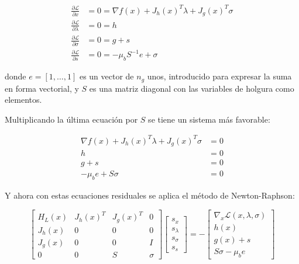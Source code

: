 \begin{align}
	\frac{\partial \mathcal{L}}{\partial x}       & = 0 = \nabla f(x) + J_h(x)^T \lambda + J_g(x)^T \sigma \\
	\frac{\partial \mathcal{L}}{\partial \lambda} & = 0 = h                                                \\
	\frac{\partial \mathcal{L}}{\partial \sigma}  & = 0 = g + s                                            \\
	\frac{\partial \mathcal{L}}{\partial s}       & = 0 = -\mu_b S^{-1} e + \sigma
\end{align}

donde $e = [1, \ldots, 1]$ es un vector de $n_g$ unos, introducido para
expresar la suma en forma vectorial, y $S$ es una matriz diagonal con las
variables de holgura como elementos.

Multiplicando la última ecuación por $S$ se tiene un sistema más favorable:

\begin{equation}
	\begin{aligned}
		\nabla f(x) + J_h(x)^T \lambda + J_g(x)^T \sigma & = 0 \\
		h                                                & = 0 \\
		g + s                                            & = 0 \\
		-\mu_b e + S \sigma                              & = 0
	\end{aligned}
\end{equation}

Y ahora con estas ecuaciones residuales se aplica el método de Newton-Raphson:

\begin{equation}
	\begin{bmatrix}
		H_L(x) & J_h(x)^T & J_g(x)^T & 0      \\
		J_h(x) & 0        & 0        & 0      \\
		J_g(x) & 0        & 0        & I      \\
		0      & 0        & S        & \sigma
	\end{bmatrix}
	\begin{bmatrix}
		s_x       \\
		s_\lambda \\
		s_\sigma  \\
		s_s
	\end{bmatrix}
	= -
	\begin{bmatrix}
		\nabla_x \mathcal{L}(x, \lambda, \sigma) \\
		h(x)                                     \\
		g(x) + s                                 \\
		S \sigma - \mu_b e
	\end{bmatrix}
\end{equation}

